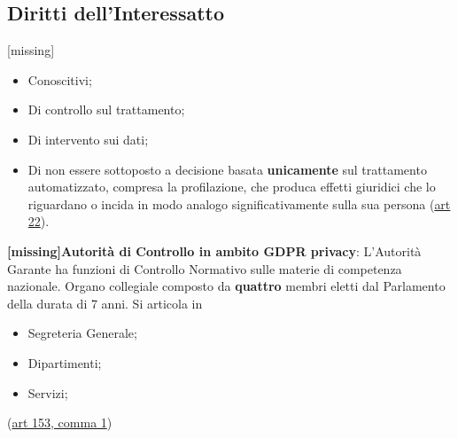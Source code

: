 \documentclass[twocolumn]{article}
\newcommand{\definition}[1]{\begin{mycolorbox}[colback=colorone]
\fontfamily{qcr}\selectfont #1 \fontfamily{cmr}\selectfont
\end{mycolorbox}}
\begin{document}
\subsection{Diritti dell'Interessatto}
[missing]
\begin{itemize}
    \item Conoscitivi;
    \item Di controllo sul trattamento;
    \item Di intervento sui dati;
    \item Di non essere sottoposto a decisione basata \textbf{unicamente} sul trattamento automatizzato, compresa la profilazione, che produca effetti giuridici che lo riguardano o incida in modo analogo significativamente sulla sua persona (\href{https://gdpr-info.eu/art-22-gdpr/}{art 22}).
\end{itemize}
\definition{\textbf{ [missing]Autorità di Controllo in ambito GDPR privacy}: L'Autorità Garante ha funzioni di Controllo Normativo sulle materie di competenza nazionale. Organo collegiale composto da \textbf{quattro} membri eletti dal Parlamento della durata di 7 anni. Si articola in \begin{itemize}
    \item Segreteria Generale;
    \item Dipartimenti;
    \item Servizi;
\end{itemize}} (\href{https://www.brocardi.it/codice-della-privacy/parte-iii/titolo-ii/capo-i/art153.html}{art 153, comma 1})
\end{document}
